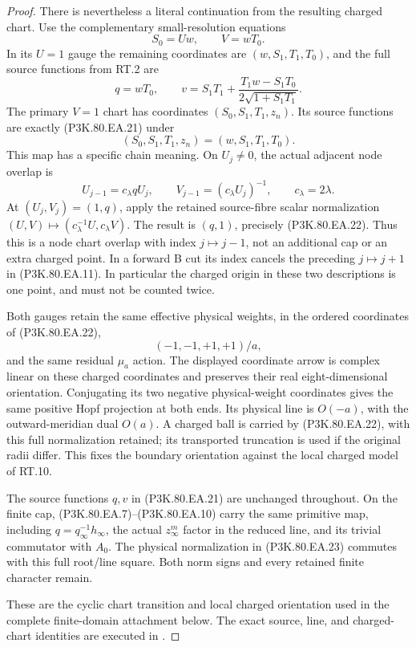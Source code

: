 \begin{proof}
There is nevertheless a literal continuation from the resulting
charged chart. Use the complementary small-resolution equations
\[
                  S_0=Uw,\qquad V=wT_0.
\]
In its \(U=1\) gauge the remaining coordinates are
\((w,S_1,T_1,T_0)\), and the full source functions from RT.2 are
\[
 q=wT_0,\qquad
 v=S_1T_1+\frac{T_1w-S_1T_0}{2\sqrt{1+S_1T_1}}.
 \tag{P3K.80.EA.21}
\]
The primary \(V=1\) chart has coordinates
\((S_0,S_1,T_1,z_n)\). Its source functions are exactly (P3K.80.EA.21)
under
\[
                (S_0,S_1,T_1,z_n)=(w,S_1,T_1,T_0).
 \tag{P3K.80.EA.22}
\]
This map has a specific chain meaning. On \(U_j\ne0\), the
actual adjacent node overlap is
\[
 U_{j-1}=c_\lambda qU_j,\qquad
 V_{j-1}=(c_\lambda U_j)^{-1},\qquad c_\lambda=2\lambda.
 \tag{P3K.80.EA.23}
\]
At \((U_j,V_j)=(1,q)\), apply the retained source-fibre scalar
normalization \((U,V)\mapsto(c_\lambda^{-1}U,c_\lambda V)\).
The result is \((q,1)\), precisely (P3K.80.EA.22). Thus this is a node
chart overlap with index \(j\mapsto j-1\), not an additional
cap or an extra charged point. In a forward B cut its index cancels
the preceding \(j\mapsto j+1\) in (P3K.80.EA.11). In particular the
charged origin in these two descriptions is one point, and must
not be counted twice.

Both gauges retain the same effective physical weights, in the
ordered coordinates of (P3K.80.EA.22),
\[
                   (-1,-1,+1,+1)/a,
\]
and the same residual \(\mu_a\) action. The displayed coordinate
arrow is complex linear on these charged coordinates and preserves
their real eight-dimensional orientation. Conjugating its two
negative physical-weight coordinates gives the same positive Hopf
projection at both ends. Its physical line is \(O(-a)\), with
the outward-meridian dual \(O(a)\). A charged ball is carried by
(P3K.80.EA.22), with this full normalization retained; its transported
truncation is used if the original radii differ. This fixes the
boundary orientation against the local charged model of RT.10.

The source functions \(q,v\) in (P3K.80.EA.21) are unchanged throughout.
On the finite cap, (P3K.80.EA.7)--(P3K.80.EA.10) carry the same primitive map,
including \(q=q_\infty^{-1}h_\infty\), the actual \(z_\infty^m\)
factor in the reduced line, and its trivial commutator with
\(A_0\). The physical normalization in (P3K.80.EA.23) commutes
with this full root/line square. Both norm signs and every retained
finite character remain.

These are the cyclic chart transition and local charged orientation used in the complete finite-domain attachment below.
The exact source, line, and charged-chart identities are executed in
.


\end{proof}
